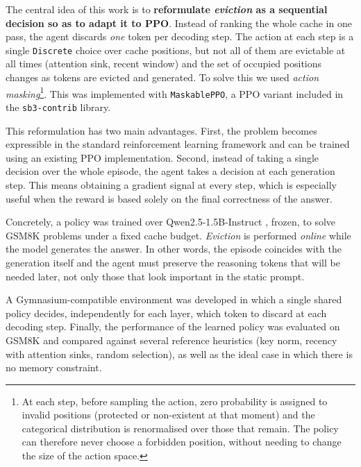 The central idea of this work is to \textbf{reformulate \textit{eviction} as a sequential decision so as to adapt it to PPO}. Instead of ranking the whole cache in one pass, the agent discards \emph{one} token per decoding step. The action at each step is a single \texttt{Discrete} choice over cache positions,
but not all of them are evictable at all times (attention sink, recent window) and the set of occupied positions changes as tokens are evicted and generated.
To solve this we used \emph{action masking}\footnote{At each step, before sampling the action, zero probability is assigned to invalid positions (protected or non-existent at that moment) and the categorical distribution is renormalised over those that remain. The policy can therefore never choose a forbidden position, without needing to change the size of the action space.}. This was implemented with \texttt{MaskablePPO}, a PPO variant included in the \texttt{sb3-contrib} library.



This reformulation has two main advantages. First, the problem becomes expressible in the standard reinforcement learning framework and can be trained using an existing PPO implementation. Second, instead of taking a single decision over the whole episode, the agent takes a decision at each generation step. This means obtaining a gradient signal at every step, which is especially useful when the reward is based solely on the final correctness of the answer.

Concretely, a policy was trained over Qwen2.5-1.5B-Instruct \cite{qwen2025}, frozen, to solve GSM8K problems \cite{cobbe2021gsm8k} under a fixed cache budget. \textit{Eviction} is performed \emph{online} while the model generates the answer. In other words, the episode coincides with the generation itself and the agent must preserve the reasoning tokens that will be needed later, not only those that look important in the static prompt.

A Gymnasium-compatible environment was developed in which a single shared policy decides, independently for each layer, which token to discard at each decoding step. Finally, the performance of the learned policy was evaluated on GSM8K and compared against several reference heuristics (key norm, recency with attention sinks, random selection), as well as the ideal case in which there is no memory constraint.
